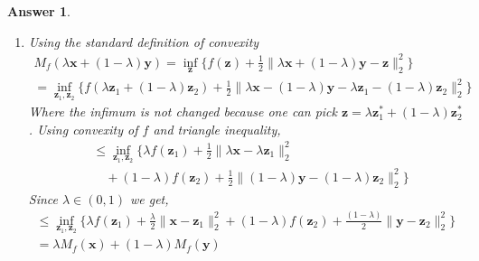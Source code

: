 \documentclass[12pt]{article}
\theoremstyle{colon}
\newtheorem*{answer}{Answer}
\begin{document}
\begin{answer}
	\
	\begin{enumerate}[label=\alph*)]
		\item Using the standard definition of convexity
			\begin{gather*}
				M_f(\lambda \bm{x} + (1-\lambda) \bm{y}) = \inf_{\bm{z}} \{ f(\bm{z}) + \frac{1}{2} \lVert \lambda \bm{x} + (1-\lambda) \bm{y} - \bm{z} \rVert_2^2 \} \\
				= \inf_{\bm{z}_1, \bm{z}_2} \{ f(\lambda \bm{z}_1 + (1-\lambda)\bm{z}_2) + \frac{1}{2} \lVert \lambda \bm{x} -  (1-\lambda) \bm{y} - \lambda \bm{z}_1 - (1-\lambda)\bm{z}_2 \rVert_2^2 \}
			\end{gather*}
			Where the infimum is not changed because one can pick $\bm{z} = \lambda \bm{z}_1^* + (1-\lambda)\bm{z}_2^*$. Using convexity of $f$ and triangle inequality,
			\begin{align*}
				&\leq \inf_{\bm{z}_1, \bm{z}_2} \{ \lambda f(\bm{z}_1) + \frac{1}{2} \lVert \lambda \bm{x} - \lambda \bm{z}_1 \rVert_2^2 \\
				&\quad + (1-\lambda) f(\bm{z}_2) + \frac{1}{2} \lVert (1-\lambda) \bm{y} - (1-\lambda) \bm{z}_2 \rVert_2^2 \}
			\end{align*}
			Since $\lambda \in (0,1)$ we get,
			\begin{gather*}
				\leq \inf_{\bm{z}_1, \bm{z}_2} \{ \lambda f(\bm{z}_1) + \frac{\lambda}{2} \lVert \bm{x} - \bm{z}_1 \rVert_2^2 + (1-\lambda) f(\bm{z}_2) + \frac{(1-\lambda)}{2} \lVert  \bm{y} - \bm{z}_2 \rVert_2^2 \} \\
				= \lambda M_f(\bm{x}) + (1-\lambda) M_f(\bm{y})
			\end{gather*}
			

\end{enumerate}
\end{answer}
\end{document}
